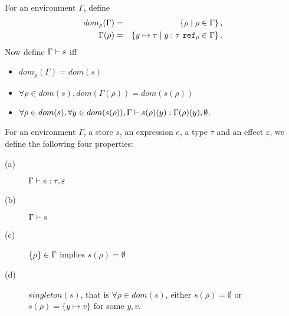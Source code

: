 \documentclass[a4paper]{article}
\begin{document}
\begin{definition}
  For an environment $\Gamma$, define 
  \begin{eqnarray*}
    dom_\rho(\Gamma) &=& \left\{ \rho \mid \rho\in \Gamma \right\}, \\
    \Gamma(\rho) &=& \left\{ y \mapsto \tau \mid y : {\normalfont \tau\ \texttt{ref}_{\rho}} \in \Gamma\right\}.
  \end{eqnarray*}
  Now define $\Gamma \vdash s $ iff
  \begin{itemize}
    \item $dom_\rho(\Gamma) = dom(s)$
    \item $\forall \rho\in dom(s), dom(\Gamma(\rho)) = dom(s(\rho))$
    \item $\forall \rho\in dom(s), \forall y\in dom(s(\rho)),
      \Gamma \vdash s(\rho)(y) : \Gamma(\rho)(y), \emptyset $.
  \end{itemize}
\end{definition}


\begin{definition}
  \label{def:invariants}
  For an environment $\Gamma$, a store $s$, an expression $e$, a type $\tau$ and an
  effect $\varepsilon$, we define the following four properties:
  \begin{description}
    \item[(a)] $\Gamma \vdash e : \tau, \varepsilon $
    \item[(b)] $\Gamma \vdash s $
    \item[(c)] $\left\{ \rho \right\} \in \Gamma$ implies $s(\rho) = \emptyset$
    \item[(d)] $singleton(s)$, that is $\forall\rho\in dom(s)$, either $s(\rho) =
      \emptyset$ or $s(\rho) = \{ y \mapsto v\}$ for some $y,v$.
  \end{description}
\end{definition}
\end{document}
